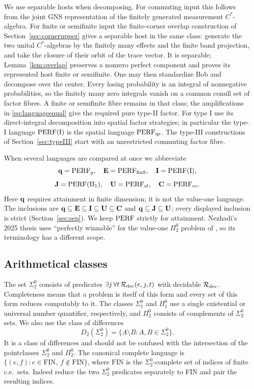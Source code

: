 We use separable hosts when decomposing. For commuting input this follows from the joint GNS representation of the finitely generated measurement $C^*$-algebra. For finite or semifinite input the finite-corner overlap construction of Section~\ref{sec:cornerupper} gives a separable host in the same class: generate the two unital $C^*$-algebras by the finitely many effects and the finite band projection, and take the closure of their orbit of the trace vector. It is separable; Lemma~\ref{lem:overlap} preserves a nonzero perfect component and proves its represented host finite or semifinite. One may then standardize Bob and decompose over the center. Every losing probability is an integral of nonnegative probabilities, so the finitely many zero integrals vanish on a common conull set of factor fibres. A finite or semifinite fibre remains in that class; the amplifications in \eqref{eq:languageequal} give the required pure type-II factor. For type I use its direct-integral decomposition into spatial factor strategies; in particular the type-I language $\mathrm{PERF}(\mathrm I)$ is the spatial language $\mathrm{PERF}_{\mathrm{qs}}$. The type-III constructions of Section~\ref{sec:typeIII} start with an unrestricted commuting factor fibre.

When several languages are compared at once we abbreviate
\[
 \mathbf q=\mathrm{PERF}_q,\quad \mathbf E=\mathrm{PERF}_{\mathrm{finS}},\quad \mathbf I=\mathrm{PERF}(\mathrm I),
\]
\[
 \mathbf J=\mathrm{PERF}(\mathrm{II}_1),\quad \mathbf U=\mathrm{PERF}_{\mathrm{sf}},\quad \mathbf C=\mathrm{PERF}_{\mathrm{co}}.
\]
Here $\mathbf q$ requires attainment in finite dimension; it is not the value-one language. The inclusions are $\mathbf q\subseteq\mathbf E\subseteq\mathbf I\subseteq\mathbf U\subseteq\mathbf C$ and $\mathbf q\subseteq\mathbf J\subseteq\mathbf U$; every displayed inclusion is strict (Section~\ref{sec:sep}). We keep $\mathrm{PERF}$ strictly for attainment. Nezhadi's 2025 thesis \cite{Nezhadi} uses ``perfectly winnable'' for the value-one $\Pi^0_2$ problem of \cite{MNY}, so its terminology has a different scope.

\subsection{Arithmetical classes}
The set $\Sigma^0_2$ consists of predicates $\exists j\,\forall t\,\mathcal R_{\rm dec}(e,j,t)$ with decidable $\mathcal R_{\rm dec}$. Completeness means that a problem is itself of this form and every set of this form reduces computably to it. The classes $\Sigma^0_1$ and $\Pi^0_1$ use a single existential or universal number quantifier, respectively, and $\Pi^0_2$ consists of complements of $\Sigma^0_2$ sets. We also use the class of differences
\[
 D_2(\Sigma^0_2)=\{A\setminus B:A,B\in\Sigma^0_2\}.
\]
It is a class of differences and should not be confused with the intersection of the pointclasses $\Sigma^0_2$ and $\Pi^0_2$. The canonical complete language is $\{(e,f):e\in\mathrm{FIN},\ f\notin\mathrm{FIN}\}$, where $\mathrm{FIN}$ is the $\Sigma^0_2$-complete set of indices of finite c.e.\ sets. Indeed reduce the two $\Sigma^0_2$ predicates separately to FIN and pair the resulting indices.

